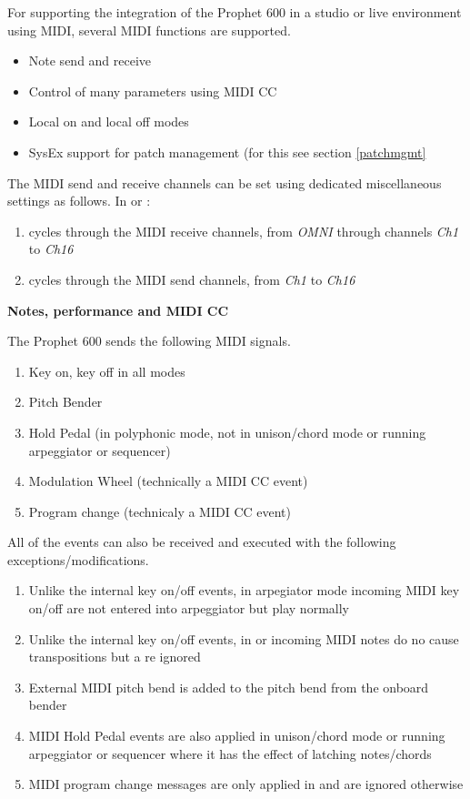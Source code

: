 For supporting the integration of the Prophet 600 in a studio or live environment using MIDI, several MIDI functions are supported.

\begin{itemize}
  \item Note send and receive
  \item Control of many parameters using MIDI CC
  \item Local on and local off modes
  \item SysEx support for patch management (for this see section \ref{patchmgmt}
\end{itemize}

The MIDI send and receive channels can be set using dedicated miscellaneous settings as follows. In \shiftmode or \shiftlock:

\begin{enumerate}
  \setlength\itemsep{0cm}
  \item {} cycles through the MIDI receive channels, from \textit{OMNI} through channels \textit{Ch1} to \textit{Ch16}
  \item {}  cycles through the MIDI send channels, from \textit{Ch1} to \textit{Ch16}
\end{enumerate}

\textbf{Notes, performance and MIDI CC}

The Prophet 600 sends the following MIDI signals. 

\begin{enumerate}
  \setlength\itemsep{0cm}
  \item Key on, key off in all modes
  \item Pitch Bender
  \item Hold Pedal (in polyphonic mode, not in unison/chord mode or running arpeggiator or sequencer)
  \item Modulation Wheel (technically a MIDI CC event)
  \item Program change (technicaly a MIDI CC event)
\end{enumerate}

All of the events can also be received and executed with the following exceptions/modifications.

\begin{enumerate}
  \setlength\itemsep{0cm}
  \item Unlike the internal key on/off events, in arpegiator mode incoming MIDI key on/off are not entered into arpeggiator but play normally 
  \item Unlike the internal key on/off events, in \shiftmode or \shiftlock incoming MIDI notes do no cause transpositions but a re ignored 
  \item External MIDI pitch bend is added to the pitch bend from the onboard bender 
  \item MIDI Hold Pedal events are also applied in unison/chord mode or running arpeggiator or sequencer where it has the effect of latching notes/chords
  \item MIDI program change messages are only applied in \presetmode and are ignored otherwise  
\end{enumerate}

